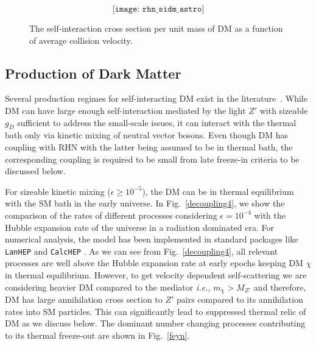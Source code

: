 \documentclass[prd,nofootinbib,preprint,superscriptaddress]{revtex4}
\begin{document}
		 
		
		
		\begin{figure}
			$$
			\texttt{[image: rhn\_sidm\_astro]}
			$$
			\caption{The self-interaction cross section per unit mass of DM as a function of average collision velocity.}
			\label{astrofit}
		\end{figure} 
		
		\subsection{Production of Dark Matter}
		\label{dm_production}
		
		Several production regimes for self-interacting DM exist in the literature~\cite{Kouvaris:2014uoa, Bernal:2015ova, Kainulainen:2015sva, Hambye:2019tjt, Cirelli:2016rnw, Kahlhoefer:2017umn, Belanger:2011ww}. While DM can have large enough self-interaction mediated by the light $Z'$ with sizeable $g_D$ sufficient to address the small-scale issues, it can interact with the thermal bath only via kinetic mixing of neutral vector bosons. Even though DM has coupling with RHN with the latter being assumed to be in thermal bath, the corresponding coupling is required to be small from late freeze-in criteria to be discussed below. 
		
		
		For sizeable kinetic mixing ($\epsilon \geq 10^{-5}$), the DM can be in thermal equilibrium with the SM bath in the early universe. In Fig.~\ref{decoupling4}, we show the comparison of the rates of different processes considering $\epsilon = 10^{-4}$ with the Hubble expansion rate of the universe in a radiation dominated era.  For numerical analysis, the model has been implemented in standard packages like \texttt{LanHEP} \cite{Semenov:2014rea} and \texttt{CalcHEP} \cite{Belyaev:2012qa}. As we can see from Fig.~\ref{decoupling4}, all relevant processes are well above the Hubble expansion rate at early epochs keeping DM $\chi$ in thermal equilibrium. However, to get velocity dependent self-scattering we are considering heavier DM compared to the mediator {\it i.e.,} $m_{\chi} > M_{Z'}$ and therefore, DM has large annihilation cross section to $Z'$ pairs compared to its annihilation rates into SM particles. This can significantly lead to suppressed thermal relic of DM as we discuss below. The dominant number changing processes contributing to its thermal freeze-out are shown in Fig.~\ref{feyn}. 
		
\end{document}
